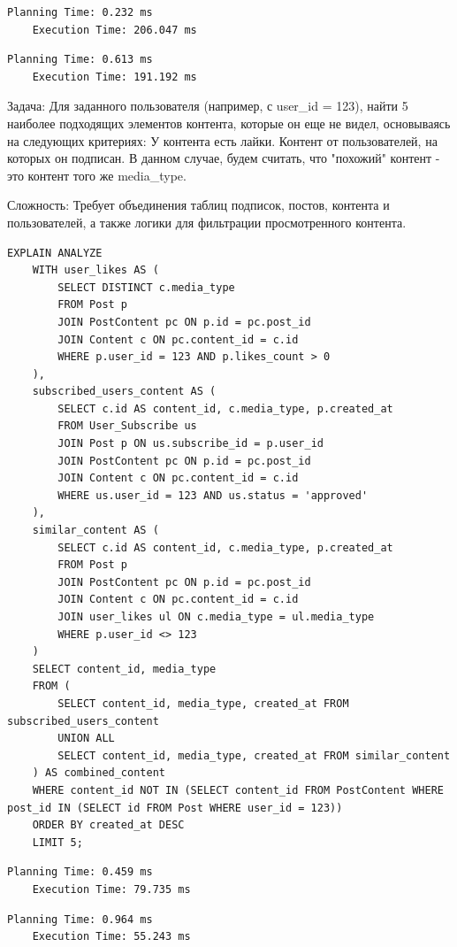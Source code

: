 \documentclass{article}
\begin{document}
\begin{lstlisting}[caption={explain analyze without indexes}, label={lst:example}]
    Planning Time: 0.232 ms
    Execution Time: 206.047 ms
\end{lstlisting}
\begin{lstlisting}[caption={explain analyze with indexes}, label={lst:example}]
    Planning Time: 0.613 ms
    Execution Time: 191.192 ms
\end{lstlisting}

Задача: Для заданного пользователя (например, с user\_id = 123), найти 5 наиболее подходящих элементов контента,
которые он еще не видел, основываясь на следующих критериях:
У контента есть лайки.
Контент от пользователей, на которых он подписан.
В данном случае, будем считать, что "похожий" контент - это контент того же media\_type.

Сложность: Требует объединения таблиц подписок, постов, контента и пользователей, 
а также логики для фильтрации просмотренного контента.
\begin{lstlisting}[caption={recommend}, label={lst:example}]
    EXPLAIN ANALYZE
    WITH user_likes AS (
        SELECT DISTINCT c.media_type
        FROM Post p
        JOIN PostContent pc ON p.id = pc.post_id
        JOIN Content c ON pc.content_id = c.id
        WHERE p.user_id = 123 AND p.likes_count > 0 
    ),
    subscribed_users_content AS (
        SELECT c.id AS content_id, c.media_type, p.created_at
        FROM User_Subscribe us
        JOIN Post p ON us.subscribe_id = p.user_id
        JOIN PostContent pc ON p.id = pc.post_id
        JOIN Content c ON pc.content_id = c.id
        WHERE us.user_id = 123 AND us.status = 'approved'
    ),
    similar_content AS (
        SELECT c.id AS content_id, c.media_type, p.created_at
        FROM Post p
        JOIN PostContent pc ON p.id = pc.post_id
        JOIN Content c ON pc.content_id = c.id
        JOIN user_likes ul ON c.media_type = ul.media_type
        WHERE p.user_id <> 123 
    )
    SELECT content_id, media_type
    FROM (
        SELECT content_id, media_type, created_at FROM subscribed_users_content
        UNION ALL
        SELECT content_id, media_type, created_at FROM similar_content
    ) AS combined_content
    WHERE content_id NOT IN (SELECT content_id FROM PostContent WHERE post_id IN (SELECT id FROM Post WHERE user_id = 123)) 
    ORDER BY created_at DESC
    LIMIT 5;
\end{lstlisting}
\begin{lstlisting}[caption={explain analyze without indexes}, label={lst:example}]
    Planning Time: 0.459 ms
    Execution Time: 79.735 ms
\end{lstlisting}
\begin{lstlisting}[caption={explain analyze with indexes}, label={lst:example}]
    Planning Time: 0.964 ms
    Execution Time: 55.243 ms
\end{lstlisting}
\end{document}
